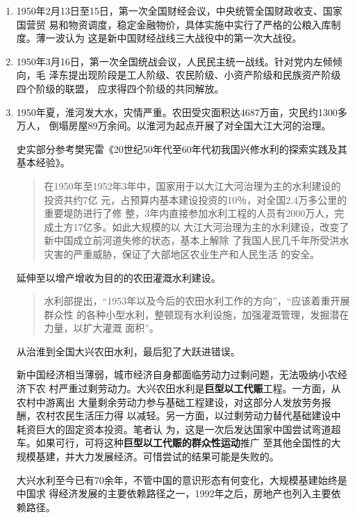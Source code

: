 \begin{enumerate}

\item 1950年2月13日至15日，第一次全国财经会议，中央统管全国财政收支、国家国营贸
  易和物资调度，稳定金融物价，具体实施中实行了严格的公粮入库制度。薄一波认为
  这是新中国财经战线三大战役中的第一次大战役。

\item 1950年3月16日，第一次全国统战会议，人民民主统一战线。针对党内左倾倾向，毛
  泽东提出现阶段是工人阶级、农民阶级、小资产阶级和民族资产阶级四个阶级的联盟，
  应求得四个阶级的共同解放。

\item 1950年夏，淮河发大水，灾情严重。农田受灾面积达4687万亩，灾民约1300多万人，
  倒塌房屋89万余间。以淮河为起点开展了对全国大江大河的治理。

  史实部分参考樊宪雷《20世纪50年代至60年代初我国兴修水利的探索实践及其基本经验》。
  \begin{quotation}
    在1950年至1952年3年中，国家用于以大江大河治理为主的水利建设的投资共约7亿
    元，占预算内基本建设投资的10％，对全国2.4万多公里的重要堤防进行了修
    整，3年内直接参加水利工程的人员有2000万人，完成土方17亿多。如此大规模的以
    大江大河治理为主的水利建设，改变了新中国成立前河道失修的状态，基本上解除
    了我国人民几千年所受洪水灾害的严重威胁，保证了大部地区农业生产和人民生活
    的安全。
  \end{quotation}
  延伸至以增产增收为目的的农田灌溉水利建设。
  \begin{quotation}
    水利部提出，“1953年以及今后的农田水利工作的方向”，“应该着重开展群众性
    的各种小型水利，整顿现有水利设施，加强灌溉管理，发掘潜在力量，以扩大灌溉
    面积”。
  \end{quotation}
  从治淮到全国大兴农田水利，最后犯了大跃进错误。

  新中国经济相当薄弱，城市经济自身都面临劳动力过剩问题，无法吸纳小农经济下农
  村严重过剩劳动力。大兴农田水利是\textbf{巨型以工代赈}工程。一方面，从农村中游离出
  大量剩余劳动力参与基础工程建设，对这部分人发放劳务报酬，农村农民生活压力得
  以减轻。另一方面，以过剩劳动力替代基础建设中耗资巨大的固定资本投资。笔者认
  为，这是一次后发达国家中国尝试弯道超车。如果可行，可将这种\textbf{巨型以工代赈的群众性运动}推广
  至其他全国性的大规模基建，并大力发展经济。可惜尝试的结果可能是失败的。

  大兴水利至今已有70余年，不管中国的意识形态有何变化，大规模基建始终是中国求
  得经济发展的主要依赖路径之一，1992年之后，房地产也列入主要依赖路径。


\end{enumerate}
